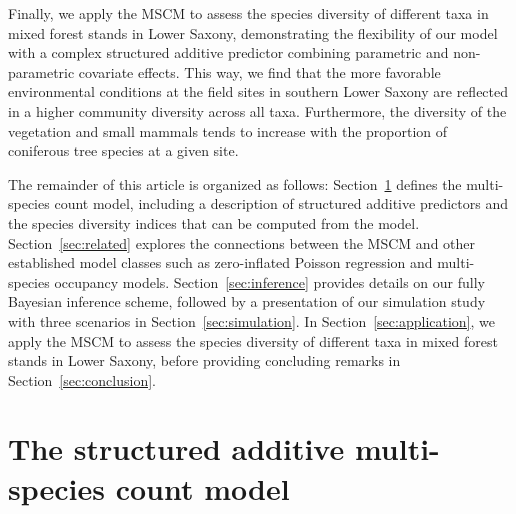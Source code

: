 \documentclass{article}
\begin{document}
Finally, we apply the MSCM to assess the species diversity of different taxa in mixed forest stands in Lower Saxony, demonstrating the flexibility of our model with a complex structured additive predictor combining parametric and non-parametric covariate effects. This way, we find that the more favorable environmental conditions at the field sites in southern Lower Saxony are reflected in a higher community diversity across all taxa. Furthermore, the diversity of the vegetation and small mammals tends to increase with the proportion of coniferous tree species at a given site.

The remainder of this article is organized as follows: Section~\ref{sec:mscm} defines the multi-species count model, including a description of structured additive predictors and the species diversity indices that can be computed from the model. Section~\ref{sec:related} explores the connections between the MSCM and other established model classes such as zero-inflated Poisson regression and multi-species occupancy models. Section~\ref{sec:inference} provides details on our fully Bayesian inference scheme, followed by a presentation of our simulation study with three scenarios in Section~\ref{sec:simulation}. In Section~\ref{sec:application}, we apply the MSCM to assess the species diversity of different taxa in mixed forest stands in Lower Saxony, before providing concluding remarks in Section~\ref{sec:conclusion}.

\section{The structured additive multi-species count model}
\label{sec:mscm}
\end{document}
